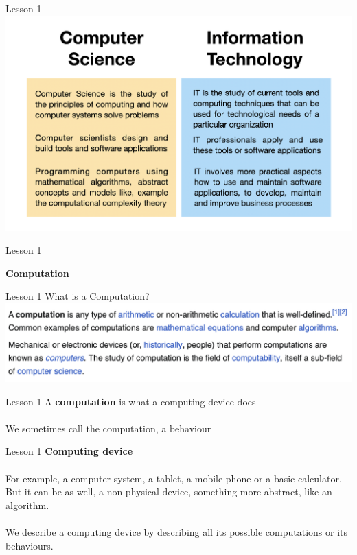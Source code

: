 \documentclass[aspectratio=1610]{beamer}
\begin{document}
\begin{frame}{Lesson 1}{}
\includegraphics[scale=0.15]{Images/csvsit.png}
\end{frame}

\begin{frame}{Lesson 1}{}
\begin{center}
\Huge \textbf{Computation}
\end{center}
\end{frame}

\begin{frame}{Lesson 1}{}
{\Huge{What is a Computation?}}
\includegraphics[scale=0.58]{Images/computation.png}
\end{frame}



\begin{frame}{Lesson 1}{}
\Huge
A \textbf{computation} is what a \alert{computing device} does\\~\\

\Large
We sometimes call the computation, a behaviour

\end{frame}



\begin{frame}{Lesson 1}{}
\LARGE
\textbf{Computing device}\\~\\
\Large
For example, a computer system, a tablet, a mobile phone or a basic calculator. But it can be as well, a non physical device, something more abstract, like an \alert{algorithm}.\\~\\

We describe a computing device by describing all its possible computations or its behaviours. 

\end{frame}
\end{document}

